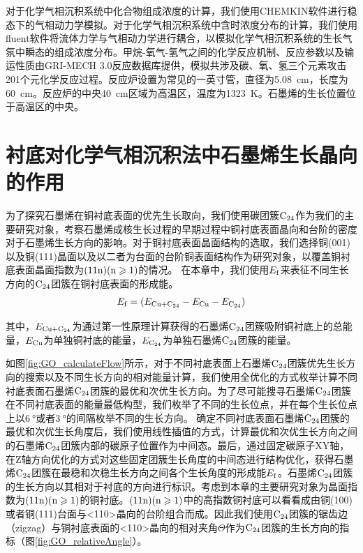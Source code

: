 对于化学气相沉积系统中化合物组成浓度的计算，我们使用CHEMKIN软件进行稳态下的气相动力学模拟。对于化学气相沉积系统中含时浓度分布的计算，我们使用fluent软件将流体力学与气相动力学进行耦合，以模拟化学气相沉积系统的生长气氛中瞬态的组成浓度分布。甲烷-氧气-氢气之间的化学反应机制、反应参数以及输运性质由GRI-MECH 3.0反应数据库提供，模拟共涉及碳、氧、氢三个元素攻击201个元化学反应过程。反应炉设置为常见的一英寸管，直径为\SI{5.08}{\centi\metre}，长度为\SI{60}{\centi\metre}。反应炉的中央\SI{40}{\centi\metre}区域为高温区，温度为\SI{1323}{\kelvin}。石墨烯的生长位置位于高温区的中央。

\section{衬底对化学气相沉积法中石墨烯生长晶向的作用}
\label{sec:石墨烯优先生长取向}
为了探究石墨烯在铜衬底表面的优先生长取向，我们使用碳团簇$\rm{C_{24}}$作为我们的主要研究对象，考察石墨烯成核生长过程的早期过程中铜衬底表面晶向和台阶的密度对于石墨烯生长方向的影响。对于铜衬底表面晶面结构的选取，我们选择铜(001)以及铜(111)晶面以及以二者为台面的台阶铜表面结构作为研究对象，以覆盖铜衬底表面晶面指数为$\rm{(11n)(n \geqslant 1)}$的情况。
在本章中，我们使用$E_{\rm{f}}$来表征不同生长方向的$\rm{C_{24}}$团簇在铜衬底表面的形成能。
\begin{equation}
    E_{\rm{f}}=
    (E_{\rm{Cu+\rm{C_{24}}}}-E_{\rm{Cu}}-E_{\rm{\rm{C_{24}}}})
\end{equation}

其中，$E_{\rm{Cu+\rm{C_{24}}}}$为通过第一性原理计算获得的石墨烯$\rm{C_{24}}$团簇吸附铜衬底上的总能量，$E_{\rm{Cu}}$为单独铜衬底的能量，$E_{\rm{\rm{C_{24}}}}$为单独石墨烯$\rm{C_{24}}$团簇的能量。

如图\ref{fig:GO_calculateFlow}所示，对于不同衬底表面上石墨烯$\rm{C_{24}}$团簇优先生长方向的搜索以及不同生长方向的相对能量计算，我们使用全优化的方式枚举计算不同衬底表面石墨烯$\rm{C_{24}}$团簇的最优和次优生长方向。为了尽可能搜寻石墨烯$\rm{C_{24}}$团簇在不同衬底表面的能量最低构型，我们枚举了不同的生长位点，并在每个生长位点上以$\SI{6}{\degree}$或者$\SI{3}{\degree}$的间隔枚举不同的生长方向。 确定不同衬底表面石墨烯$\rm{C_{24}}$团簇的最优和次优生长角度后，我们使用线性插值的方式，计算最优和次优生长方向之间的石墨烯$\rm{C_{24}}$团簇内部的碳原子位置作为中间态。最后，通过固定碳原子XY轴，在Z轴方向优化的方式对这些固定团簇生长角度的中间态进行结构优化，获得石墨烯$\rm{C_{24}}$团簇在最稳和次稳生长方向之间各个生长角度的形成能$E_{\rm{f}}$。石墨烯$\rm{C_{24}}$团簇的生长方向以其相对于衬底的方向进行标识。考虑到本章的主要研究对象为晶面指数为$\rm{(11n)(n \geqslant 1)}$的铜衬底。$\rm{(11n)(n \geqslant 1)}$中的高指数铜衬底可以看看成由铜(100)或者铜(111)台面与<110>晶向的台阶组合而成。因此我们使用$\rm{C_{24}}$团簇的锯齿边（zigzag）与铜衬底表面的<110>晶向的相对夹角$\Theta$作为$\rm{C_{24}}$团簇的生长方向的指标（图\ref{fig:GO_relativeAngle}）。


